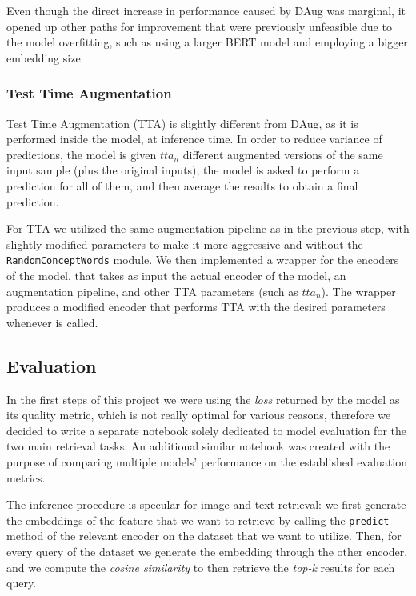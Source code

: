 \documentclass[12pt, a4paper]{article}
\begin{document}
Even though the direct increase in performance caused by DAug was marginal, it opened up other paths for improvement that were previously unfeasible due to the model overfitting, such as using a larger BERT model and employing a bigger embedding size.

\subsubsection{Test Time Augmentation}
Test Time Augmentation (TTA) is slightly different from DAug, as it is performed inside the model, at inference time.
In order to reduce variance of predictions, the model is given $tta_n$ different augmented versions of the same input sample (plus the original inputs), the model is asked to perform a prediction for all of them, and then average the results to obtain a final prediction.

For TTA we utilized the same augmentation pipeline as in the previous step, with slightly modified parameters to make it more aggressive and without the \texttt{RandomConceptWords} module.
We then implemented a wrapper for the encoders of the model, that takes as input the actual encoder of the model, an augmentation pipeline, and other TTA parameters (such as $tta_n$). The wrapper produces a modified encoder that performs TTA with the desired parameters whenever is called.


\subsection{Evaluation}
In the first steps of this project we were using the \textit{loss} returned by the model as its quality metric, which is not really optimal for various reasons, therefore we decided to write a separate notebook solely dedicated to model evaluation for the two main retrieval tasks.
An additional similar notebook was created with the purpose of comparing multiple models' performance on the established evaluation metrics.

The inference procedure is specular for image and text retrieval: we first generate the embeddings of the feature that we want to retrieve by calling the \texttt{predict} method of the relevant encoder on the dataset that we want to utilize.
Then, for every query of the dataset we generate the embedding through the other encoder, and we compute the \textit{cosine similarity} to then retrieve the \textit{top-k} results for each query.
\end{document}
